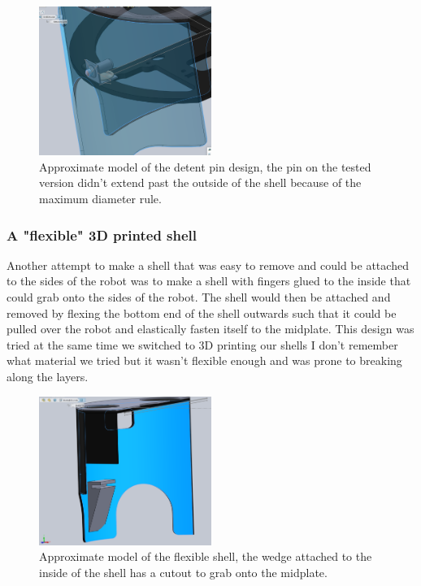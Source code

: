 \documentclass{iopart}
\begin{document}
\begin{figure}[h!]
    \centering
    \includegraphics[width=0.5\textwidth]{graphics/detent.png}\\
    Approximate model of the detent pin design, the pin on the tested version didn't extend past the outside of the shell because of the maximum diameter rule.
\end{figure}

\subsubsection{A "flexible" 3D printed shell}

Another attempt to make a shell that was easy to remove and could be attached to the sides of the robot was to make a shell with fingers glued to the inside that could grab onto the sides of the robot. The shell would then be attached and removed by flexing the bottom end of the shell outwards such that it could be pulled over the robot and elastically fasten itself to the midplate. This design was tried at the same time we switched to 3D printing our shells I don't remember what material we tried but it wasn't flexible enough and was prone to breaking along the layers.

\begin{figure}[h!]
    \centering
    \includegraphics[width=0.5\textwidth]{graphics/flexible_shell.png}\\
    Approximate model of the flexible shell, the wedge attached to the inside of the shell has a cutout to grab onto the midplate.
\end{figure}
\end{document}
